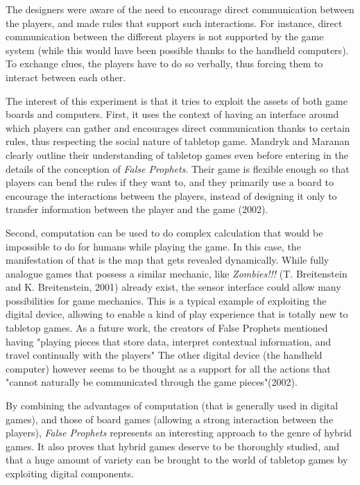The designers were aware of the need to encourage direct communication between the players, and made rules that support such interactions. For instance, direct communication between the different players is not supported by the game system (while this would have been possible thanks to the handheld computers). To exchange clues, the players have to do so verbally, thus forcing them to interact between each other. 

The interest of this experiment is that it tries to exploit the assets of both game boards and computers. First, it uses the context of having an interface around which players can gather and encourages direct communication thanks to certain rules, thus respecting the social nature of tabletop game. Mandryk and Maranan clearly outline their understanding of tabletop games even before entering in the details of the conception of \textit{False Prophets}. Their game is flexible enough so that players can bend the rules if they want to, and they primarily use a board to encourage the interactions between the players, instead of designing it only to transfer information between the player and the game (2002)\cite{art:prophets}.

Second, computation can be used to do complex calculation that would be impossible to do for humans while playing the game. In this case, the manifestation of that is the map that gets revealed dynamically.  While fully analogue games  that possess a similar mechanic, like \textit{Zombies!!!} (T. Breitenstein and K. Breitenstein, 2001)\cite{game:zombies} already exist, the sensor interface could allow many possibilities for game mechanics. This is a typical example of exploiting the digital device, allowing to enable a kind of play experience that is totally new to tabletop games. As a future work, the creators of False Prophets mentioned having "playing pieces that store data, interpret contextual information, and travel continually with the players" The other digital device (the handheld computer) however seems to be thought as a support for all the actions that "cannot naturally be communicated through the game pieces"(2002)\cite{art:prophets}.

By combining the advantages of computation (that is generally used in digital games), and those of board games (allowing a strong interaction between the players), \textit{False Prophets} represents an interesting approach to the genre of hybrid games. It also proves that hybrid games deserve to be thoroughly studied, and that a huge amount of variety can be brought to the world of tabletop games by exploiting digital components.

